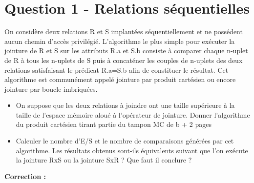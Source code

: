 \documentclass[11pt]{article}
\begin{document}
\section{Question 1 - Relations séquentielles}
On considère deux relations R et S implantées séquentiellement et ne possédent aucun chemin d'accès privilégié. L'algorithme le plus simple pour exécuter la jointure de R et S sur les attributs R.a et S.b consiste à comparer chaque n-uplet de R à tous les n-uplets de S puis à concaténer les couples de n-uplets des deux relations satisfaisant le prédicat R.a=S.b afin de constituer le résultat. Cet algorithme est communément appelé jointure par produit cartésien ou encore jointure par boucle imbriquées.\\
\begin{itemize}
\item On suppose que les deux relations à joindre ont une taille supérieure à la taille de l'espace mémoire aloué à l'opérateur de jointure. Donner l'algorithme du produit cartésien tirant partie du tampon MC de b + 2 pages
\item Calculer le nombre d'E/S et le nombre de comparaisons générées par cet algorithme. Les résultats obtenus sont-ils équivalents suivant que l'on exécute la jointure RxS ou la jointure SxR ? Que faut il conclure ?
\end{itemize}
\textbf{Correction :}
\end{document}
